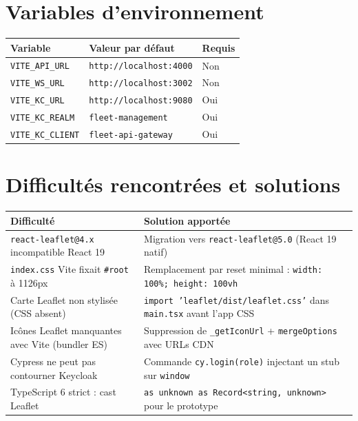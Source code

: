 \documentclass[12pt,a4paper]{report}
\begin{document}
\section{Variables d'environnement}

\begin{center}
\begin{tabular}{|l|l|C{1.5cm}|}
  \hline
  \textbf{Variable} & \textbf{Valeur par défaut} & \textbf{Requis} \\
  \hline
  \texttt{VITE\_API\_URL}        & \texttt{http://localhost:4000} & Non \\
  \texttt{VITE\_WS\_URL}         & \texttt{http://localhost:3002} & Non \\
  \texttt{VITE\_KC\_URL}         & \texttt{http://localhost:9080} & Oui \\
  \texttt{VITE\_KC\_REALM}       & \texttt{fleet-management}      & Oui \\
  \texttt{VITE\_KC\_CLIENT}      & \texttt{fleet-api-gateway}     & Oui \\
  \hline
\end{tabular}
\end{center}

\section{Difficultés rencontrées et solutions}

\begin{center}
\begin{tabular}{|L{5cm}|L{8.5cm}|}
  \hline
  \textbf{Difficulté} & \textbf{Solution apportée} \\
  \hline
  \texttt{react-leaflet@4.x} incompatible React 19
    & Migration vers \texttt{react-leaflet@5.0} (React 19 natif) \\
  \hline
  \texttt{index.css} Vite fixait \texttt{\#root} à 1126px
    & Remplacement par reset minimal : \texttt{width: 100\%; height: 100vh} \\
  \hline
  Carte Leaflet non stylisée (CSS absent)
    & \texttt{import 'leaflet/dist/leaflet.css'} dans \texttt{main.tsx} avant l'app CSS \\
  \hline
  Icônes Leaflet manquantes avec Vite (bundler ES)
    & Suppression de \texttt{\_getIconUrl} + \texttt{mergeOptions} avec URLs CDN \\
  \hline
  Cypress ne peut pas contourner Keycloak
    & Commande \texttt{cy.login(role)} injectant un stub sur \texttt{window} \\
  \hline
  TypeScript 6 strict : cast Leaflet
    & \texttt{as unknown as Record<string, unknown>} pour le prototype \\
  \hline
\end{tabular}
\end{center}
\end{document}
